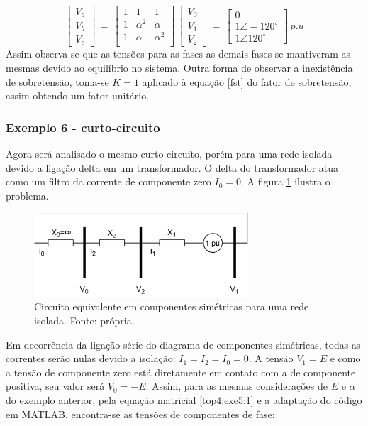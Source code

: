 \begin{equation} \label{top4:exe5:1}
 \begin{bmatrix} V_a \\ V_b \\ V_c  \end{bmatrix} \,=\, \begin{bmatrix} 
  1 & 1 & 1 \\ 
  1 & \alpha^2 & \alpha  \\
  1 & \alpha & \alpha^2 \\  
 \end{bmatrix}\, 
 \begin{bmatrix} V_0 \\ V_1 \\ V_2  \end{bmatrix} \,=\, 
 \begin{bmatrix} 0 \\ 1 \angle-120^{\circ} \\ 1 \angle120^{\circ} \end{bmatrix} \, p.u
\end{equation}
Assim observa-se que as tensões para as fases as demais fases se mantiveram as mesmas devido ao equilíbrio no sistema. Outra forma de observar a inexistência de sobretensão, toma-se $K=1$ aplicado à equação \ref{fst} do fator de sobretensão, assim obtendo um fator unitário.

\subsubsection*{Exemplo 6 - curto-circuito}

Agora será analisado o mesmo curto-circuito, porém para uma rede isolada devido a ligação delta em um transformador. O delta do transformador atua como um filtro da corrente de componente zero $I_0 = 0$. A figura \ref{top4:fig:2} ilustra o problema.

\begin{figure}[H]
\begin{center}
\includegraphics[width=8cm]{images/cc_2.jpg}
\caption{Circuito equivalente em componentes simétricas para uma rede isolada. Fonte: própria.}
\label{top4:fig:2} 
\end{center}
\end{figure}
Em decorrência da ligação série do diagrama de componentes simétricas, todas as correntes serão nulas devido a isolação: $I_1=I_2=I_0=0$. A tensão $V_1 = E$ e como a tensão de componente zero está diretamente em contato com a de componente positiva, seu valor será $V_0=-E$. Assim, para as mesmas considerações de $E$ e $\alpha$ do exemplo anterior, pela equação matricial \ref{top4:exe5:1} e a adaptação do código em MATLAB, encontra-se as tensões de componentes de fase:

